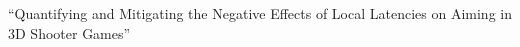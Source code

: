 ``Quantifying and Mitigating the Negative Effects of Local Latencies on Aiming in 3D Shooter Games'' \cite{Ivkovic:2015:QMN:2702123.2702432}





